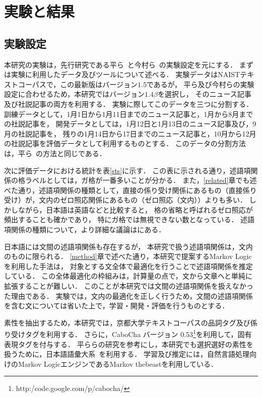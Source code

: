 \documentclass[japanese]{jnlp_1.4}
\begin{document}
\section{実験と結果}
\label{ex}

\subsection{実験設定}

本研究の実験は，先行研究である平ら~\cite{taira:2008:emnlp}と今村ら~\cite{imamura:2009:acl}の実験設定を元にする．
まずは実験に利用したデータ及びツールについて述べる．
実験データはNAISTテキストコーパスで，この最新版はバージョン$1.5$であるが，
平ら及び今村らの実験設定に合わせるため，本研究ではバージョン$1.4\beta$を選択し，
そのニュース記事及び社説記事の両方を利用する．
実験に際してこのデータを三つに分割する．
訓練データとして，1月1日から1月11日までのニュース記事と，1月から8月までの社説記事を，
開発データとしては，1月12日と1月13日のニュース記事及び，9月の社説記事を，
残りの1月14日から17日までのニュース記事と，10月から12月の社説記事を評価データとして利用するものとする．
このデータの分割方法は，平ら~\cite{taira:2008:emnlp}の方法と同じである．

次に評価データにおける統計を表\ref{sts}に示す．
この表に示される通り，述語項関係の格ラベルとしては，ガ格が一番多いことが分かる．
また，\ref{related}章でも述べた通り，述語項関係の種類として，直接の係り受け関係にあるもの（直接係り受け）が，文内のゼロ照応関係にあるもの（ゼロ照応（文内））よりも多い．
しかしながら，日本語は英語などと比較すると，
格の省略と呼ばれるゼロ照応が頻出することも確かであり，
特にガ格では無視できない数となっている．
述語項関係の種類について，より詳細な議論は\cite{iida:2006:acl}にある．

日本語には文間の述語項関係も存在するが，
本研究で扱う述語項関係は，文内のものに限られる．
\ref{method}章で述べた通り，本研究で提案するMarkov Logicを利用した手法は，
対象とする文全体で最適化を行うことで述語項関係を推定している．
この全体最適化の枠組みは，計算量の点で，文から文章へと単純に拡張することが難しい．
このことが本研究では文間の述語項関係を扱えなかった理由である．
実験では，文内の最適化を正しく行うため，文間の述語項関係を含む文については省いた上で，学習・開発・評価を行うものとする．

素性を抽出するため，本研究では，京都大学テキストコーパスの品詞タグ及び係り受けタグを利用する．
さらに，CaboCha バージョン 0.53\footnote{http:/code.google.com/p/cabocha/}を利用して，固有表現タグを付与する．
平ららの研究を参考にし，本研究でも選択選好の素性を扱うために，日本語語彙大系~\cite{ikehara:1997}を利用する．
学習及び推定には，自然言語処理向けのMarkov LogicエンジンであるMarkov thebeastを利用している．
\end{document}
